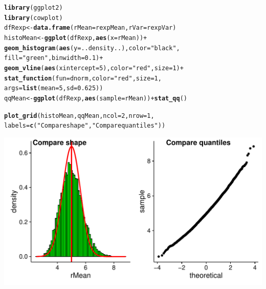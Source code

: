 \documentclass[a4paper, 10pt]{article}\usepackage[]{graphicx}\usepackage[]{color}
\makeatletter
\def\maxwidth{ %
  \ifdim\Gin@nat@width>\linewidth
    \linewidth
  \else
    \Gin@nat@width
  \fi
}
\newcommand{\hlnum}[1]{\textcolor[rgb]{0.686,0.059,0.569}{#1}}%
\newcommand{\hlstr}[1]{\textcolor[rgb]{0.192,0.494,0.8}{#1}}%
\newcommand{\hlopt}[1]{\textcolor[rgb]{0,0,0}{#1}}%
\newcommand{\hlstd}[1]{\textcolor[rgb]{0.345,0.345,0.345}{#1}}%
\newcommand{\hlkwb}[1]{\textcolor[rgb]{0.69,0.353,0.396}{#1}}%
\newcommand{\hlkwc}[1]{\textcolor[rgb]{0.333,0.667,0.333}{#1}}%
\newcommand{\hlkwd}[1]{\textcolor[rgb]{0.737,0.353,0.396}{\textbf{#1}}}%
\newenvironment{kframe}{%
 \def\at@end@of@kframe{}%
 \ifinner\ifhmode%
  \def\at@end@of@kframe{\end{minipage}}%
  \begin{minipage}{\columnwidth}%
 \fi\fi%
 \def\FrameCommand##1{\hskip\@totalleftmargin \hskip-\fboxsep
 \colorbox{shadecolor}{##1}\hskip-\fboxsep
     \hskip-\linewidth \hskip-\@totalleftmargin \hskip\columnwidth}%
 \MakeFramed {\advance\hsize-\width
   \@totalleftmargin\z@ \linewidth\hsize
   \@setminipage}}%
 {\par\unskip\endMakeFramed%
 \at@end@of@kframe}
\newenvironment{knitrout}{}{} %
\makeatother
\begin{document}
\begin{knitrout}\small
{}\color{fgcolor}\begin{kframe}
\begin{alltt}
\hlkwd{library}\hlstd{(ggplot2)}
\hlkwd{library}\hlstd{(cowplot)}
\hlstd{dfRexp}  \hlkwb{<-} \hlkwd{data.frame}\hlstd{(}\hlkwc{rMean}\hlstd{=rexpMean,} \hlkwc{rVar}\hlstd{=rexpVar)}
\hlstd{histoMean} \hlkwb{<-} \hlkwd{ggplot}\hlstd{(dfRexp,} \hlkwd{aes}\hlstd{(}\hlkwc{x}\hlstd{=rMean))} \hlopt{+}
    \hlkwd{geom_histogram}\hlstd{(}\hlkwd{aes}\hlstd{(}\hlkwc{y}\hlstd{=..density..),} \hlkwc{color}\hlstd{=}\hlstr{"black"}\hlstd{,}
                   \hlkwc{fill}\hlstd{=}\hlstr{"green"}\hlstd{,} \hlkwc{binwidth}\hlstd{=}\hlnum{0.1}\hlstd{)} \hlopt{+}
    \hlkwd{geom_vline}\hlstd{(}\hlkwd{aes}\hlstd{(}\hlkwc{xintercept}\hlstd{=}\hlnum{5}\hlstd{),} \hlkwc{color}\hlstd{=}\hlstr{"red"}\hlstd{,} \hlkwc{size}\hlstd{=}\hlnum{1}\hlstd{)} \hlopt{+}
    \hlkwd{stat_function}\hlstd{(}\hlkwc{fun}\hlstd{=dnorm,} \hlkwc{color}\hlstd{=}\hlstr{"red"}\hlstd{,} \hlkwc{size}\hlstd{=}\hlnum{1}\hlstd{,}
                  \hlkwc{args}\hlstd{=}\hlkwd{list}\hlstd{(}\hlkwc{mean}\hlstd{=}\hlnum{5}\hlstd{,} \hlkwc{sd}\hlstd{=}\hlnum{0.625}\hlstd{))}
\hlstd{qqMean} \hlkwb{<-} \hlkwd{ggplot}\hlstd{(dfRexp,} \hlkwd{aes}\hlstd{(}\hlkwc{sample}\hlstd{=rMean))} \hlopt{+} \hlkwd{stat_qq}\hlstd{()}

\hlkwd{plot_grid}\hlstd{(histoMean, qqMean,} \hlkwc{ncol}\hlstd{=}\hlnum{2}\hlstd{,} \hlkwc{nrow}\hlstd{=}\hlnum{1}\hlstd{,}
          \hlkwc{labels}\hlstd{=}\hlkwd{c}\hlstd{(}\hlstr{"Compare shape"}\hlstd{,}\hlstr{"Compare quantiles"}\hlstd{))}
\end{alltt}
\end{kframe}
\includegraphics[width=\maxwidth]{figure/plots-1} 

\end{knitrout}
\end{document}
